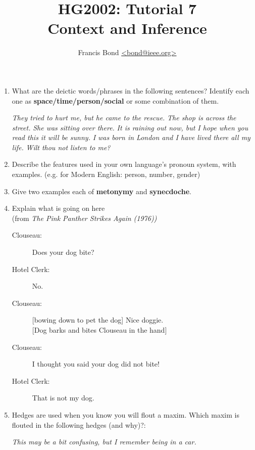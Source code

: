 \documentclass[a4paper]{article}
\title{\vspace*{-30mm}HG2002: Tutorial 7\\  Context and Inference}
\author{Francis Bond \url{<bond@ieee.org>}}
\date{}%
\begin{document}
\maketitle

\begin{enumerate}

\item What are the deictic words/phrases in the following sentences?
  Identify each one as \textbf{space/time/person/social} or 
  some combination of them.

  \begin{exe}
    \ex \textit{They tried to hurt me, but he came to the rescue.}
    \ex \textit{The shop is across the street.}
    \ex \textit{She was sitting over there.}
    \ex \textit{It is raining out now, but I hope when you read this it will be sunny.}
    \ex \textit{I was born in London and I have lived there all my life.}
    \ex \textit{Wilt thou not listen to me?}
  \end{exe}
\item Describe the features used in your own language's pronoun system, with examples.
  (e.g. for Modern English: person, number, gender)

\item Give two examples each of \textbf{metonymy} and \textbf{synecdoche}.
\item Explain what is going on here 
  \\ (from \textit{The Pink Panther Strikes Again (1976))}
  \begin{description}
    \item[Clouseau:] Does your dog bite?
    \item[Hotel Clerk:] No.
    \item[Clouseau:] [bowing down to pet the dog] Nice doggie.
      \\ {}[Dog barks and bites Clouseau in the hand]
    \item[Clouseau:] I thought you said your dog did not bite!
    \item[Hotel Clerk:] That is not my dog. 
    \end{description}
  

\item Hedges are used when you know you will flout a maxim.  Which
  maxim is flouted in the following hedges (and why)?:

\begin{exe}
\ex \textit{This may be a bit confusing, but I remember being in a car.}


\end{exe}
\end{enumerate}
\end{document}
